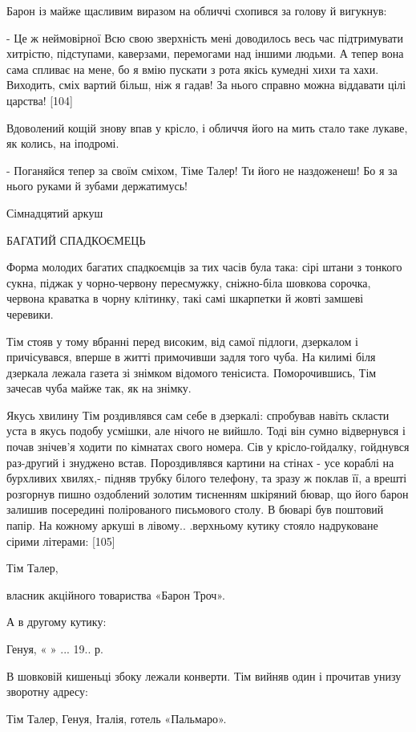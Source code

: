 Барон із майже щасливим виразом на обличчі схопився за голову й вигукнув:

- Це ж неймовірної Всю свою зверхність мені доводилось весь час підтримувати хитрістю, підступами, каверзами, перемогами над іншими людьми. А тепер вона сама спливає на мене, бо я вмію пускати з рота якісь кумедні хихи та хахи. Виходить, сміх вартий більш, ніж я гадав! За нього справно можна віддавати цілі царства! [104]

Вдоволений кощій знову впав у крісло, і обличчя його на мить стало таке лукаве, як колись, на іподромі.

- Поганяйся тепер за своїм сміхом, Тіме Талер! Ти його не наздоженеш! Бо я за нього руками й зубами держатимусь!

Сімнадцятий аркуш

БАГАТИЙ СПАДКОЄМЕЦЬ

Форма молодих багатих спадкоємців за тих часів була така: сірі штани з тонкого сукна, піджак у чорно-червону пересмужку, сніжно-біла шовкова сорочка, червона краватка в чорну клітинку, такі самі шкарпетки й жовті замшеві черевики.

Тім стояв у тому вбранні перед високим, від самої підлоги, дзеркалом і причісувався, вперше в житті примочивши задля того чуба. На килимі біля дзеркала лежала газета зі знімком відомого тенісиста. Поморочившись, Тім зачесав чуба майже так, як на знімку.

Якусь хвилину Тім роздивлявся сам себе в дзеркалі: спробував навіть скласти уста в якусь подобу усмішки, але нічого не вийшло. Тоді він сумно відвернувся і почав знічев'я ходити по кімнатах свого номера. Сів у крісло-гойдалку, гойднувся раз-другий і знуджено встав. Пороздивлявся картини на стінах - усе кораблі на бурхливих хвилях,- підняв трубку білого телефону, та зразу ж поклав її, а врешті розгорнув пишно оздоблений золотим тисненням шкіряний бювар, що його барон залишив посередині полірованого письмового столу. В бюварі був поштовий папір. На кожному аркуші в лівому.. .верхньому кутику стояло надруковане сірими літерами: [105]

Тім Талер,

власник акційного товариства «Барон Троч».

А в другому кутику:

Генуя, « » ... 19.. р.

В шовковій кишеньці збоку лежали конверти. Тім вийняв один і прочитав унизу зворотну адресу:

Тім Талер, Генуя, Італія, готель «Пальмаро».

